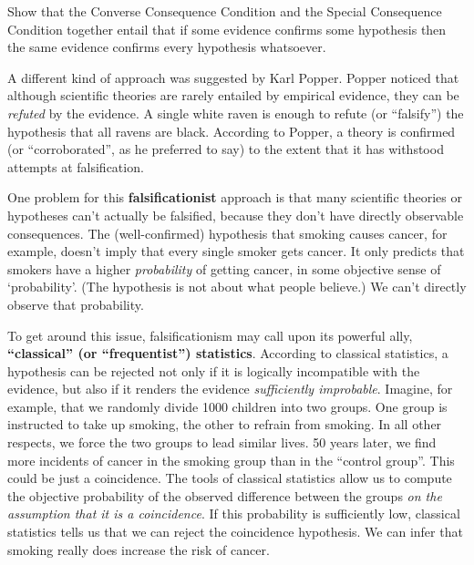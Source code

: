 % 
\begin{exercise}{2}
  Show that the Converse Consequence Condition and the Special Consequence
  Condition together entail that if some evidence confirms some hypothesis
  then the same evidence confirms every hypothesis whatsoever.
\end{exercise}

A different kind of approach was suggested by Karl Popper. Popper noticed that
although scientific theories are rarely entailed by empirical evidence, they can
be \emph{refuted} by the evidence. A single white raven is enough to refute (or
``falsify'') the hypothesis that all ravens are black. According to Popper, a
theory is confirmed (or ``corroborated'', as he preferred to say) to the extent
that it has withstood attempts at falsification.

One problem for this \textbf{falsificationist} approach is that many scientific
theories or hypotheses can't actually be falsified, because they don't have
directly observable consequences. The (well-confirmed) hypothesis that
smoking causes cancer, for example, doesn't imply that every single smoker gets
cancer. It only predicts that smokers have a higher \emph{probability} of
getting cancer, in some objective sense of `probability'. (The hypothesis is not
about what people believe.) We can't directly observe that probability.

To get around this issue, falsificationism may call upon its powerful ally,
\textbf{``classical'' (or ``frequentist'') statistics}. According to classical
statistics, a hypothesis can be rejected not only if it is logically
incompatible with the evidence, but also if it renders the evidence
\emph{sufficiently improbable}. Imagine, for example, that we randomly divide
1000 children into two groups. One group is instructed to take up smoking, the
other to refrain from smoking. In all other respects, we force the two groups to
lead similar lives. 50 years later, we find more incidents of cancer in the
smoking group than in the ``control group''. This could be just a coincidence.
The tools of classical statistics allow us to compute the objective probability
of the observed difference between the groups \emph{on the assumption that it is
  a coincidence}. If this probability is sufficiently low, classical statistics
tells us that we can reject the coincidence hypothesis. We can infer that
smoking really does increase the risk of cancer.

